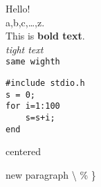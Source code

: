 \documentclass[12pt]{article}
\begin{document}
Hello!\\
a,b,c,\ldots,z.\\
This is \textbf{bold text}.\\
\textit{tight text}\\
\texttt{same wighth}

\begin{verbatim}
#include stdio.h
s = 0;
for i=1:100
    s=s+i;
end
\end{verbatim}

\begin	{center}
centered
\end{center}

new paragraph
\textbackslash  %
 \% \}
 
\end{document}
